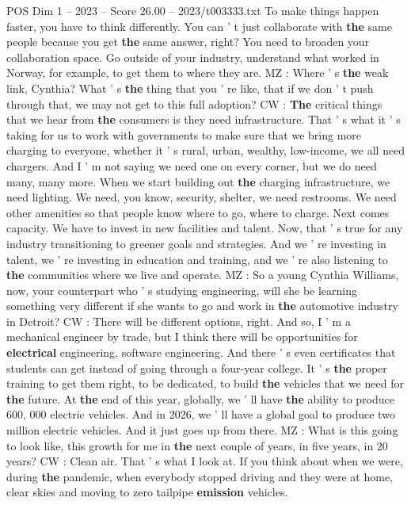 \begin{textsample}{POS Dim 1 – 2023 – Score 26.00 – 2023/t003333.txt}
To make things happen faster, you have to think differently.
You can ' t just collaborate with \textbf{the} same people because you get \textbf{the} same answer, right?
You need to broaden your collaboration space.
Go outside of your industry, understand what worked in Norway, for example, to get them to where they are.
MZ : Where ' s \textbf{the} weak link, Cynthia?
What ' s \textbf{the} thing that you ' re like, that if we don ' t push through that, we may not get to this full adoption?
CW : \textbf{The} critical things that we hear from \textbf{the} consumers is they need infrastructure.
That ' s what it ' s taking for us to work with governments to make sure that we bring more charging to everyone, whether it ' s rural, urban, wealthy, low-income, we all need chargers.
And I ' m not saying we need one on every corner, but we do need many, many more.
When we start building out \textbf{the} charging infrastructure, we need lighting.
We need, you know, security, shelter, we need restrooms.
We need other amenities so that people know where to go, where to charge.
Next comes capacity.
We have to invest in new facilities and talent.
Now, that ' s true for any industry transitioning to greener goals and strategies.
And we ' re investing in talent, we ' re investing in education and training, and we ' re also listening to \textbf{the} communities where we live and operate.
MZ : So a young Cynthia Williams, now, your counterpart who ' s studying engineering, will she be learning something very different if she wants to go and work in \textbf{the} automotive industry in Detroit?
CW : There will be different options, right.
And so, I ' m a mechanical engineer by trade, but I think there will be opportunities for \textbf{electrical} engineering, software engineering.
And there ' s even certificates that students can get instead of going through a four-year college.
It ' s \textbf{the} proper training to get them right, to be dedicated, to build \textbf{the} vehicles that we need for \textbf{the} future.
At \textbf{the} end of this year, globally, we ' ll have \textbf{the} ability to produce 600, 000 electric vehicles.
And in 2026, we ' ll have a global goal to produce two million electric vehicles.
And it just goes up from there.
MZ : What is this going to look like, this growth for me in \textbf{the} next couple of years, in five years, in 20 years?
CW : Clean air.
That ' s what I look at.
If you think about when we were, during \textbf{the} pandemic, when everybody stopped driving and they were at home, clear skies and moving to zero tailpipe \textbf{emission} vehicles.

\end{textsample}
